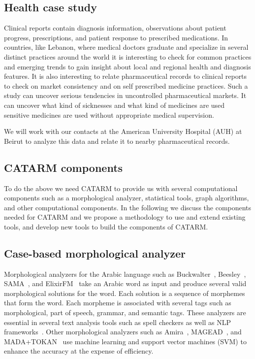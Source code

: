 \documentclass[12pt]{article}
\begin{document}
\subsection{Health case study}
\label{s:design:med}

Clinical reports contain diagnosis information, observations about 
patient progress, prescriptions, and patient response to prescribed 
medications. 
In countries, like Lebanon, where medical doctors graduate and specialize 
in several distinct practices around the world it is interesting to 
check for common practices and emerging trends to gain insight
about local and regional health and diagnosis features. 
It is also interesting to relate 
pharmaceutical 
records to clinical reports to check on 
market consistency and on self prescribed medicine 
practices.
Such a study can uncover serious tendencies in uncontrolled
pharmaceutical markets.
It can uncover what kind of sicknesses and what kind of medicines
are used sensitive medicines are used without 
appropriate medical supervision. 

We will work with our contacts at the American University
Hospital (AUH) at Beirut to analyze this data and relate it
to nearby pharmaceutical records. 

\subsection{CATARM components}
\label{s:design:components}

To do the above we need CATARM to provide us with several 
computational components such as a morphological analyzer, 
statistical tools, graph algorithms, and other computational
components. 
In the following we discuss the components needed for 
CATARM and we propose a methodology to 
use and extend existing tools, and develop new tools to
build the components of CATARM.

\subsection{Case-based morphological analyzer}
\label{s:design:ma}

Morphological analyzers for the Arabic language
such as Buckwalter~\cite{Buckwalter:02},
Beesley~\cite{Beesley:01}, SAMA~\cite{Kulick:10},
and ElixirFM~\cite{Otakar:07} take an Arabic word as input
and produce several valid morphological solutions for the word. 
Each solution is a sequence of morphemes that form the word.
Each morpheme is associated with several tags such as 
morphological, part of speech, grammar, and semantic tags. 
These analyzers are essential in several text analysis tools such 
as spell checkers as well as NLP frameworks~\cite{Col09}.
Other morphological analyzers such as 
Amira~\cite{Diab:07,Benajiba:07},
MAGEAD~\cite{Habash:05}, and MADA+TOKAN~\cite{Habash:09} 
use machine learning and support vector machines (SVM) 
to enhance the accuracy at the expense of efficiency.
\end{document}
